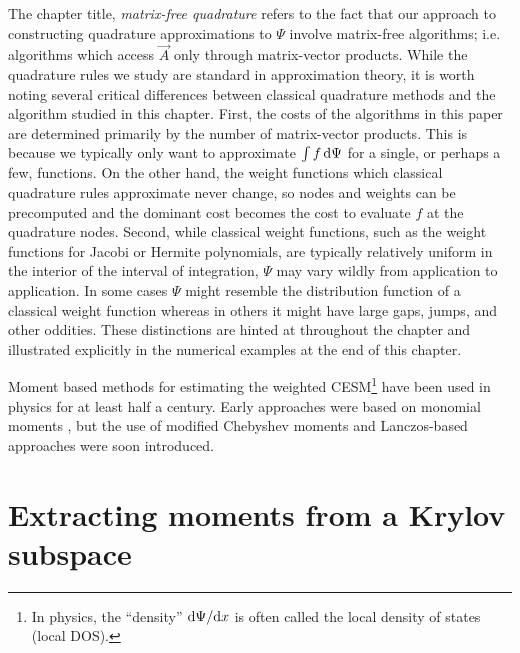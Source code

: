     The chapter title, \emph{matrix-free quadrature} refers to the fact that our approach to constructing quadrature approximations to \( \Psi \) involve matrix-free algorithms; i.e. algorithms which access \( \vec{A} \) only through matrix-vector products.
    While the quadrature rules we study are standard in approximation theory, it is worth noting several critical differences between classical quadrature methods and the algorithm studied in this chapter.
    First, the costs of the algorithms in this paper are determined primarily by the number of matrix-vector products.
    This is because we typically only want to approximate \( \int f\,\textup{d}\Psi \) for a single, or perhaps a few, functions. 
    On the other hand, the weight functions which classical quadrature rules approximate never change, so nodes and weights can be precomputed and the dominant cost becomes the cost to evaluate \( f \) at the quadrature nodes.
    Second, while classical weight functions, such as the weight functions for Jacobi or Hermite polynomials, are typically relatively uniform in the interior of the interval of integration, \( \Psi \) may vary wildly from application to application. 
    In some cases \( \Psi \) might resemble the distribution function of a classical weight function whereas in others it might have large gaps, jumps, and other oddities.
    These distinctions are hinted at throughout the chapter and illustrated explicitly in the numerical examples at the end of this chapter.


    Moment based methods for estimating the weighted CESM\footnote{In physics, the ``density'' \( \textup{d}\Psi/\textup{d}{x} \) is often called the local density of states (local DOS).} have been used in physics for at least half a century.
    Early approaches were based on monomial moments \cite{cyrotlackmann_67,cyrotlackmann_69,ducastelle_cryotlackmann_70,ducastelle_cryotlackmann_71,cryotlackmann_ducastelle_71}, but the use of modified Chebyshev moments \cite{wheeler_blumstein_72} and Lanczos-based approaches \cite{haydock_heine_kelly_pendry_72,haydock_heine_kelly_72,haydock_heine_kelly_75} were soon introduced.




    \section{Extracting moments from a Krylov subspace}
    \label{sec:krylov_moments}


